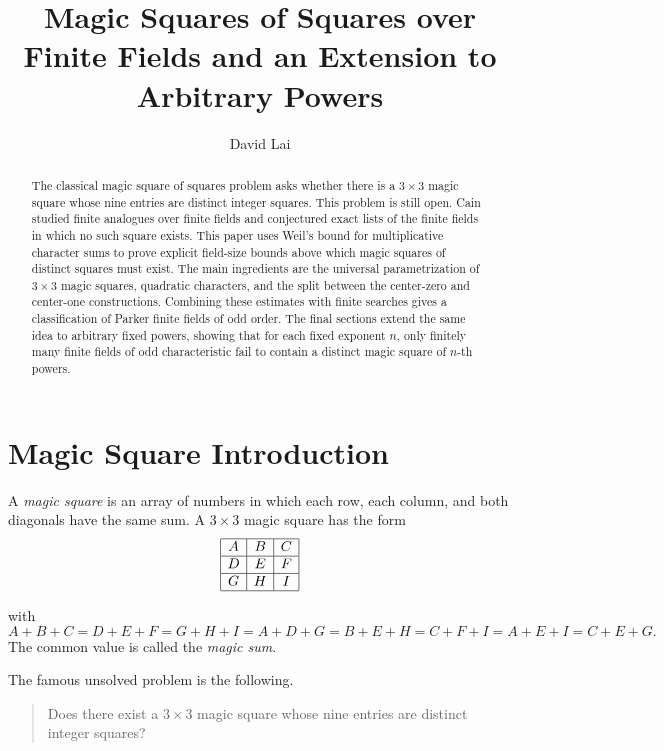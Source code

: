 \documentclass{article}
\title{Magic Squares of Squares over Finite Fields and an Extension to Arbitrary Powers}
\author{David Lai}
\theoremstyle{definition}
\numberwithin{equation}{section}
\begin{document}
\maketitle

\begin{abstract}
The classical magic square of squares problem asks whether there is a
\(3\times 3\) magic square whose nine entries are distinct integer squares. This
problem is still open. Cain studied finite analogues over finite fields and
conjectured exact lists of the finite fields in which no such square exists.
This paper uses Weil's bound for multiplicative character sums to prove explicit
field-size bounds above which magic squares of distinct squares must exist. The
main ingredients are the universal parametrization of \(3\times 3\) magic
squares, quadratic characters, and the split between the center-zero and
center-one constructions. Combining these estimates with finite searches gives a
classification of Parker finite fields of odd order. The final sections extend the same idea
to arbitrary fixed powers, showing that for each fixed exponent \(n\), only
finitely many finite fields of odd characteristic fail to contain a distinct
magic square of \(n\)-th powers.
\end{abstract}

\tableofcontents

\section{Magic Square Introduction}

A \emph{magic square} is an array of numbers in which each row, each column, and
both diagonals have the same sum. A \(3\times3\) magic square has the form
\[
\begin{array}{|c|c|c|}
\hline
A & B & C \\
\hline
D & E & F \\
\hline
G & H & I \\
\hline
\end{array}
\]

with
\[
A+B+C=D+E+F=G+H+I=A+D+G=B+E+H=C+F+I=A+E+I=C+E+G.
\]
The common value is called the \emph{magic sum}.

The famous unsolved problem is the following.

\begin{quote}
Does there exist a \(3\times3\) magic square whose nine entries are distinct
integer squares?
\end{quote}
\end{document}

